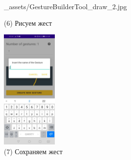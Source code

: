 \documentclass[12pt, a4paper, simple]{eskdtext}
\begin{document}
\begin{figure}[!h]
\begin{minipage}{0.24\textwidth}
                {_assets/GestureBuilderTool_draw_2.jpg}
            \caption{(6) Рисуем жест}
            \label{fig:GestureBuilderTool_draw_2}
        \end{minipage}
        \begin{minipage}{0.24\textwidth}
            \centering
            \includegraphics[height=6cm]
                {_assets/GestureBuilderTool_save_2.jpg}
            \caption{(7) Сохраняем жест}
            \label{fig:GestureBuilderTool_save_2}
        \end{minipage}
    \end{figure}
\end{document}
